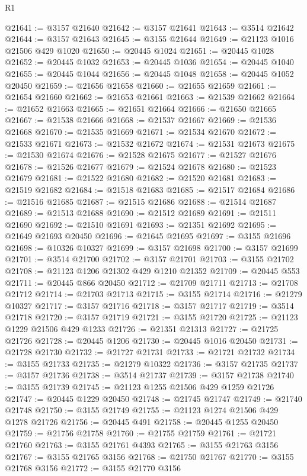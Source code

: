 \begin{lexlean}{R1}
\begin{coremodule}
@21641 := @3157 @21640
@21642 := @3157 @21641
@21643 := @3514 @21642
@21644 := @3157 @21643
@21645 := @3155 @21644
@21649 := @21123 @1016 @21506 @429 @1020
@21650 := @20445 @1024
@21651 := @20445 @1028
@21652 := @20445 @1032
@21653 := @20445 @1036
@21654 := @20445 @1040
@21655 := @20445 @1044
@21656 := @20445 @1048
@21658 := @20445 @1052 @20450
@21659 := @21656 @21658
@21660 := @21655 @21659
@21661 := @21654 @21660
@21662 := @21653 @21661
@21663 := @21539 @21662
@21664 := @21652 @21663
@21665 := @21651 @21664
@21666 := @21650 @21665
@21667 := @21538 @21666
@21668 := @21537 @21667
@21669 := @21536 @21668
@21670 := @21535 @21669
@21671 := @21534 @21670
@21672 := @21533 @21671
@21673 := @21532 @21672
@21674 := @21531 @21673
@21675 := @21530 @21674
@21676 := @21528 @21675
@21677 := @21527 @21676
@21678 := @21526 @21677
@21679 := @21524 @21678
@21680 := @21523 @21679
@21681 := @21522 @21680
@21682 := @21520 @21681
@21683 := @21519 @21682
@21684 := @21518 @21683
@21685 := @21517 @21684
@21686 := @21516 @21685
@21687 := @21515 @21686
@21688 := @21514 @21687
@21689 := @21513 @21688
@21690 := @21512 @21689
@21691 := @21511 @21690
@21692 := @21510 @21691
@21693 := @21351 @21692
@21695 := @21649 @21693 @20450
@21696 := @21645 @21695
@21697 := @3155 @21696
@21698 := @10326 @10327
@21699 := @3157 @21698
@21700 := @3157 @21699
@21701 := @3514 @21700
@21702 := @3157 @21701
@21703 := @3155 @21702
@21708 := @21123 @1206 @21302 @429 @1210 @21352
@21709 := @20445 @553
@21711 := @20445 @866 @20450
@21712 := @21709 @21711
@21713 := @21708 @21712
@21714 := @21703 @21713
@21715 := @3155 @21714
@21716 := @21279 @10327
@21717 := @3157 @21716
@21718 := @3157 @21717
@21719 := @3514 @21718
@21720 := @3157 @21719
@21721 := @3155 @21720
@21725 := @21123 @1229 @21506 @429 @1233
@21726 := @21351 @21313
@21727 := @21725 @21726
@21728 := @20445 @1206
@21730 := @20445 @1016 @20450
@21731 := @21728 @21730
@21732 := @21727 @21731
@21733 := @21721 @21732
@21734 := @3155 @21733
@21735 := @21279 @10322
@21736 := @3157 @21735
@21737 := @3157 @21736
@21738 := @3514 @21737
@21739 := @3157 @21738
@21740 := @3155 @21739
@21745 := @21123 @1255 @21506 @429 @1259 @21726
@21747 := @20445 @1229 @20450
@21748 := @21745 @21747
@21749 := @21740 @21748
@21750 := @3155 @21749
@21755 := @21123 @1274 @21506 @429 @1278 @21726
@21756 := @20445 @491
@21758 := @20445 @1255 @20450
@21759 := @21756 @21758
@21760 := @21755 @21759
@21761 := @21721 @21760
@21763 := @3155 @21761 @4393
@21765 := @3155 @21763 @3156
@21767 := @3155 @21765 @3156
@21768 := @21750 @21767
@21770 := @3155 @21768 @3156
@21772 := @3155 @21770 @3156

\end{coremodule}
\end{lexlean}
